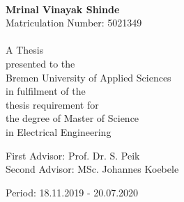 \begin{titlepage}
\begin{singlespace}
\begin{center}
\begin{spacing}{2}
{\Huge\scshape \Was}\\
\end{spacing}
\end{center}
\end{singlespace}
\vspace*{-0.3cm}
\noindent \begin{center}
\textbf{\large Mrinal Vinayak Shinde}\\
Matriculation Number: 5021349\foreignlanguage{english}{}\\
\vspace*{1cm}
\foreignlanguage{english}{~~~}\\
\foreignlanguage{english}{A Thesis}\\
\foreignlanguage{english}{presented to the }\\
\foreignlanguage{english}{Bremen University of Applied Sciences}\\
\foreignlanguage{english}{in fulfilment of the }\\
\foreignlanguage{english}{thesis requirement for }\\
\foreignlanguage{english}{the degree of Master of Science}\\
\foreignlanguage{english}{in Electrical Engineering}
\par\end{center}

\vfill{}
\vspace*{1cm}
\noindent \begin{center}
First Advisor: Prof. Dr. S. Peik\\
Second Advisor:      MSc. Johannes Koebele
\par\end{center}


\noindent \begin{center}
{\small Period: 18.11.2019 - 20.07.2020}
\par\end{center}{\small \par}

\end{titlepage}




